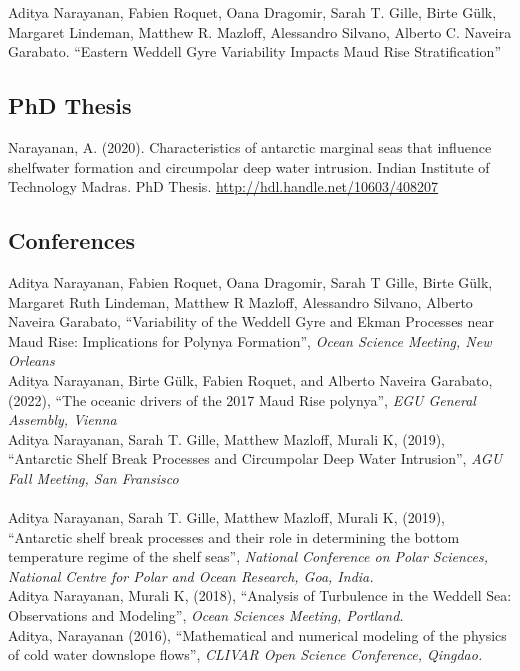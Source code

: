 \documentclass[12pt, a4paper]{article}
\newcommand{\years}[1]{\marginnote{\small #1}}
\begin{document}
\years{2024} Aditya Narayanan, Fabien Roquet, Oana Dragomir, Sarah T. Gille, Birte G\"ulk, Margaret Lindeman, Matthew R. Mazloff, Alessandro Silvano, Alberto C. Naveira Garabato. ``Eastern Weddell Gyre Variability Impacts Maud Rise Stratification''\\


\subsection*{\bf PhD Thesis}

\years{2020} Narayanan, A. (2020). Characteristics of antarctic marginal seas that influence shelfwater formation and circumpolar deep water intrusion. Indian Institute of Technology Madras. PhD Thesis. \url{http://hdl.handle.net/10603/408207}\\


\subsection*{\bf Conferences}
\years{2024} Aditya Narayanan, Fabien Roquet, Oana Dragomir, Sarah T Gille, Birte Gülk, Margaret Ruth Lindeman, Matthew R Mazloff, Alessandro Silvano, Alberto Naveira Garabato, ``Variability of the Weddell Gyre and Ekman Processes near Maud Rise: Implications for Polynya Formation'', \emph{Ocean Science Meeting, New Orleans}\\
\years{2022}Aditya Narayanan, Birte G\"ulk, Fabien Roquet, and Alberto Naveira Garabato, (2022), ``The oceanic drivers of the 2017 Maud Rise polynya'', \emph{EGU General Assembly, Vienna}\\
\years{2019}Aditya Narayanan, Sarah T. Gille, Matthew Mazloff, Murali K, (2019), ``Antarctic Shelf Break Processes and Circumpolar Deep Water Intrusion'', \emph{AGU Fall Meeting, San Fransisco}\\
\\
\years{2019}Aditya Narayanan, Sarah T. Gille, Matthew Mazloff, Murali K, (2019), ``Antarctic shelf break processes and their role in determining the bottom temperature regime of the shelf seas'', \emph{National Conference on Polar Sciences, National Centre for Polar and Ocean Research, Goa, India.}\\

\years{2018}Aditya Narayanan, Murali K, (2018), ``Analysis of Turbulence in the Weddell Sea: Observations and Modeling'', \emph{Ocean Sciences Meeting, Portland.}\\

\years{2016}Aditya, Narayanan (2016), ``Mathematical and numerical modeling of the physics of cold water downslope flows'', \emph{CLIVAR Open Science Conference, Qingdao.}
\end{document}
